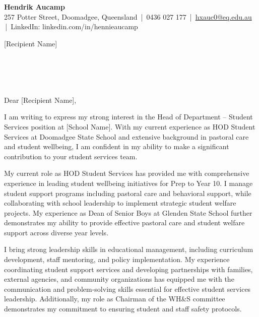 \documentclass[11pt,a4paper]{article}
\newcommand{\contact}[5]{
    \begin{center}
        {\Huge \textbf{#1}} \\[8pt]
        #2 \,|\, #3 \,|\, \href{mailto:#4}{#4} \,|\, #5
    \end{center}
    \vspace{0.5cm}
}
\newcommand{\todaydate}{\DTMnow}
\begin{document}
\contact{Hendrik Aucamp}
{257 Potter Street, Doomadgee, Queensland}
{0436 027 177}
{hxauc0@eq.edu.au}
{LinkedIn: linkedin.com/in/hennieaucamp}

\vspace{1cm}

\todaydate

\vspace{1cm}

[Recipient Name] \\
[Position Title] \\
[School/Organization Name] \\
[Address Line 1] \\
[Address Line 2] \\
[City, State, Postcode]

\vspace{1cm}

Dear [Recipient Name],

\vspace{0.5cm}

I am writing to express my strong interest in the Head of Department – Student Services position at [School Name]. With my current experience as HOD Student Services at Doomadgee State School and extensive background in pastoral care and student wellbeing, I am confident in my ability to make a significant contribution to your student services team.

My current role as HOD Student Services has provided me with comprehensive experience in leading student wellbeing initiatives for Prep to Year 10. I manage student support programs including pastoral care and behavioral support, while collaborating with school leadership to implement strategic student welfare projects. My experience as Dean of Senior Boys at Glenden State School further demonstrates my ability to provide effective pastoral care and student welfare support across diverse year levels.

I bring strong leadership skills in educational management, including curriculum development, staff mentoring, and policy implementation. My experience coordinating student support services and developing partnerships with families, external agencies, and community organizations has equipped me with the communication and problem-solving skills essential for effective student services leadership. Additionally, my role as Chairman of the WH\&S committee demonstrates my commitment to ensuring student and staff safety protocols.
\end{document}
